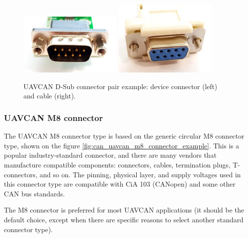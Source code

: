 \begin{figure}[hbt]
    \centering
    \includegraphics[width=0.45\textwidth]{physical_layer/de-9_connector_male_plug}
    \includegraphics[width=0.45\textwidth]{physical_layer/de-9_cable_female_socket}
    \caption{UAVCAN D-Sub connector pair example: device connector (left) and cable (right).
    \label{fig:can_uavcan_d_sub_connector_example}}
\end{figure}

\clearpage  %
\subsubsection{UAVCAN M8 connector}

The UAVCAN M8 connector type is based on the generic circular M8 connector type,
shown on the figure \ref{fig:can_uavcan_m8_connector_example}.
This is a popular industry-standard connector, and there are many vendors that manufacture compatible components:
connectors, cables, termination plugs, T-connectors, and so on.
The pinning, physical layer, and supply voltages used in this connector type are compatible with CiA 103 (CANopen)
and some other CAN bus standards.

The M8 connector is preferred for most UAVCAN applications (it should be the default choice,
except when there are specific reasons to select another standard connector type).

